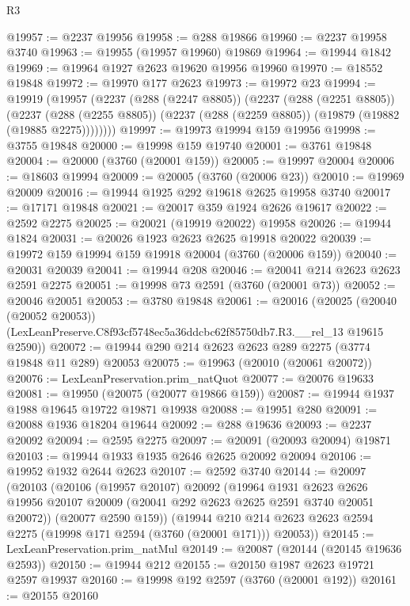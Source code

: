 \begin{lexlean}{R3}
\begin{coremodule}
@19957 := @2237 @19956
@19958 := @288 @19866
@19960 := @2237 @19958 @3740
@19963 := @19955 (@19957 @19960) @19869
@19964 := @19944 @1842
@19969 := @19964 @1927 @2623 @19620 @19956 @19960
@19970 := @18552 @19848
@19972 := @19970 @177 @2623
@19973 := @19972 @23
@19994 := @19919
    (@19957
      (@2237
        (@288 (@2247 @8805))
        (@2237
          (@288 (@2251 @8805))
          (@2237
            (@288 (@2255 @8805))
            (@2237 (@288 (@2259 @8805)) (@19879 (@19882 (@19885 @2275))))))))
@19997 := @19973 @19994 @159 @19956
@19998 := @3755 @19848
@20000 := @19998 @159 @19740
@20001 := @3761 @19848
@20004 := @20000 (@3760 (@20001 @159))
@20005 := @19997 @20004
@20006 := @18603 @19994
@20009 := @20005 (@3760 (@20006 @23))
@20010 := @19969 @20009
@20016 := @19944 @1925 @292 @19618 @2625 @19958 @3740
@20017 := @17171 @19848
@20021 := @20017 @359 @1924 @2626 @19617
@20022 := @2592 @2275
@20025 := @20021 (@19919 @20022) @19958
@20026 := @19944 @1824
@20031 := @20026 @1923 @2623 @2625 @19918 @20022
@20039 := @19972 @159 @19994 @159 @19918 @20004 (@3760 (@20006 @159))
@20040 := @20031 @20039
@20041 := @19944 @208
@20046 := @20041 @214 @2623 @2623 @2591 @2275
@20051 := @19998 @73 @2591 (@3760 (@20001 @73))
@20052 := @20046 @20051
@20053 := @3780 @19848
@20061 := @20016
    (@20025
      (@20040 (@20052 @20053))
      (LexLeanPreserve.C8f93cf5748ec5a36ddcbc62f85750db7.R3.__rel_13 @19615 @2590))
@20072 := @19944 @290 @214 @2623 @2623 @289 @2275 (@3774 @19848 @11 @289) @20053
@20075 := @19963 (@20010 (@20061 @20072))
@20076 := LexLeanPreservation.prim_natQuot
@20077 := @20076 @19633
@20081 := @19950 (@20075 (@20077 @19866 @159))
@20087 := @19944 @1937 @1988 @19645 @19722 @19871 @19938
@20088 := @19951 @280
@20091 := @20088 @1936 @18204 @19644
@20092 := @288 @19636
@20093 := @2237 @20092
@20094 := @2595 @2275
@20097 := @20091 (@20093 @20094) @19871
@20103 := @19944 @1933 @1935 @2646 @2625 @20092 @20094
@20106 := @19952 @1932 @2644 @2623
@20107 := @2592 @3740
@20144 := @20097
    (@20103
      (@20106
        (@19957 @20107)
        @20092
        (@19964
          @1931
          @2623
          @2626
          @19956
          @20107
          @20009
          (@20041 @292 @2623 @2625 @2591 @3740 @20051 @20072))
        (@20077 @2590 @159))
      (@19944 @210 @214 @2623 @2623 @2594 @2275 (@19998 @171 @2594 (@3760 (@20001 @171))) @20053))
@20145 := LexLeanPreservation.prim_natMul
@20149 := @20087 (@20144 (@20145 @19636 @2593))
@20150 := @19944 @212
@20155 := @20150 @1987 @2623 @19721 @2597 @19937
@20160 := @19998 @192 @2597 (@3760 (@20001 @192))
@20161 := @20155 @20160

\end{coremodule}
\end{lexlean}
